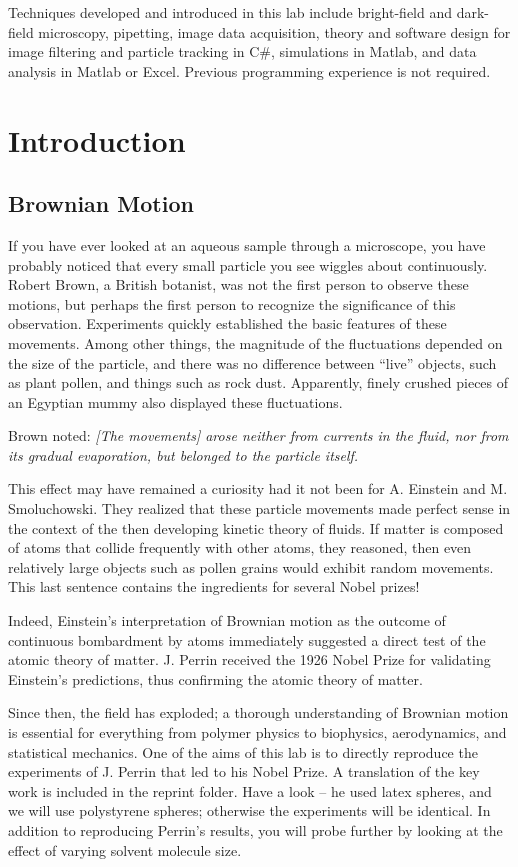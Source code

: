 \documentclass{../lab}
\begin{document}
Techniques developed and introduced in this lab include bright-field and dark-field microscopy, pipetting, image data acquisition, theory and software design for image filtering and particle tracking in C\#, simulations in Matlab, and data analysis in Matlab or Excel. Previous programming experience is not required.

\section{Introduction}

\subsection{Brownian Motion}

If you have ever looked at an aqueous sample through a microscope, you have probably noticed that every small particle you see wiggles about continuously. Robert Brown, a British botanist, was not the first person to observe these motions, but perhaps the first person to recognize the significance of this observation. Experiments quickly established the basic features of these movements. Among other things, the magnitude of the fluctuations depended on the size of the particle, and there was no difference between ``live'' objects, such as plant pollen, and things such as rock dust. Apparently, finely crushed pieces of an Egyptian mummy also displayed these fluctuations.

Brown noted: \emph{[The movements] arose neither from currents in the fluid, nor from its gradual evaporation, but belonged to the particle itself.}

This effect may have remained a curiosity had it not been for A. Einstein and M. Smoluchowski. They realized that these particle movements made perfect sense in the context of the then developing kinetic theory of fluids. If matter is composed of atoms that collide frequently with other atoms, they reasoned, then even relatively large objects such as pollen grains would exhibit random movements. This last sentence contains the ingredients for several Nobel prizes!

Indeed, Einstein's interpretation of Brownian motion as the outcome of continuous bombardment by atoms immediately suggested a direct test of the atomic theory of matter. J. Perrin received the 1926 Nobel Prize for validating Einstein's predictions, thus confirming the atomic theory of matter.

Since then, the field has exploded; a thorough understanding of Brownian motion is essential for everything from polymer physics to biophysics, aerodynamics, and statistical mechanics. One of the aims of this lab is to directly reproduce the experiments of J. Perrin that led to his Nobel Prize. A translation of the key work is included in the reprint folder. Have a look -- he used latex spheres, and we will use polystyrene spheres; otherwise the experiments will be identical. In addition to reproducing Perrin's results, you will probe further by looking at the effect of varying solvent molecule size.
\end{document}
